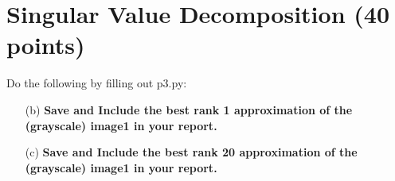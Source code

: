 \section{Singular Value Decomposition (40 points)}
Do the following by filling out p3.py:

\begin{itemize}

	\item[(b)] 
	\textbf{Save and Include the best rank 1 approximation of the (grayscale) image1 in your report.}

	\item[(c)]
	\textbf{Save and Include the best rank 20 approximation of the (grayscale) image1 in your report.}
\end{itemize}



